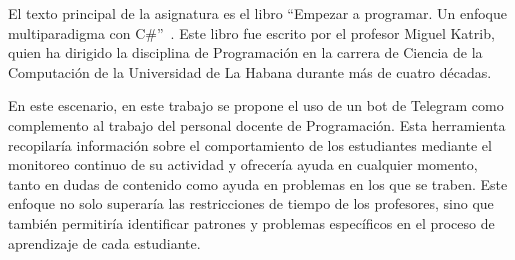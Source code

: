 \documentclass{article}
\begin{document}
El texto principal de la asignatura es el libro ``Empezar a programar. Un enfoque multiparadigma con C\#''~\cite{katrib_programar}. Este libro fue escrito por el profesor Miguel Katrib, quien ha dirigido la disciplina de Programación en la carrera de Ciencia de la Computación de la Universidad de La Habana durante más de cuatro décadas.  



En este escenario, en este trabajo se propone el uso de un bot de Telegram como complemento al trabajo del personal docente de Programación. Esta herramienta recopilaría información sobre el comportamiento de los estudiantes mediante el monitoreo continuo de su actividad y ofrecería ayuda en cualquier momento, tanto en dudas de contenido como ayuda en problemas en los que se traben. Este enfoque no solo superaría las restricciones de tiempo de los profesores, sino que también permitiría identificar patrones y problemas específicos en el proceso de aprendizaje de cada estudiante.
\end{document}
